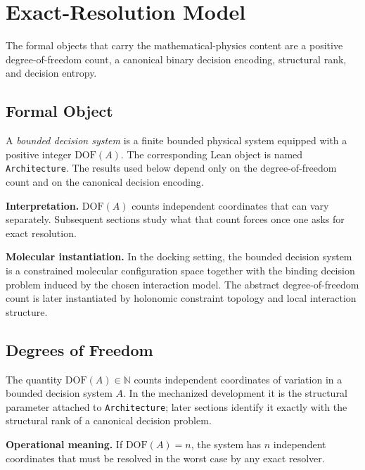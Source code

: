 \section{Exact-Resolution Model}\label{foundations}

The formal objects that carry the mathematical-physics content are a positive degree-of-freedom count, a canonical binary decision encoding, structural rank, and decision entropy.

\subsection{Formal Object}

\begin{definition}\label{def:architecture}
A \emph{bounded decision system} is a finite bounded physical system equipped with a positive integer $\mathrm{DOF}(A)$. The corresponding Lean object is named \texttt{Architecture}. The results used below depend only on the degree-of-freedom count and on the canonical decision encoding.
\end{definition}

\textbf{Interpretation.} $\mathrm{DOF}(A)$ counts independent coordinates that can vary separately. Subsequent sections study what that count forces once one asks for exact resolution.

\textbf{Molecular instantiation.} In the docking setting, the bounded decision system is a constrained molecular configuration space together with the binding decision problem induced by the chosen interaction model. The abstract degree-of-freedom count is later instantiated by holonomic constraint topology and local interaction structure.

\subsection{Degrees of Freedom}

\begin{definition}\label{def:dof}
The quantity $\mathrm{DOF}(A) \in \mathbb{N}$ counts independent coordinates of variation in a bounded decision system $A$. In the mechanized development it is the structural parameter attached to \texttt{Architecture}; later sections identify it exactly with the structural rank of a canonical decision problem.
\end{definition}

\textbf{Operational meaning.} If $\mathrm{DOF}(A)=n$, the system has $n$ independent coordinates that must be resolved in the worst case by any exact resolver.

